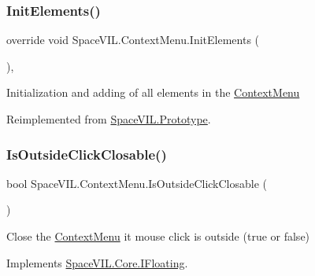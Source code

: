 \subsubsection{\texorpdfstring{Init\+Elements()}{InitElements()}}
{\footnotesize\ttfamily override void Space\+V\+I\+L.\+Context\+Menu.\+Init\+Elements (\begin{DoxyParamCaption}{ }\end{DoxyParamCaption})\hspace{0.3cm}{\ttfamily [inline]}, {\ttfamily [virtual]}}



Initialization and adding of all elements in the \mbox{\hyperlink{class_space_v_i_l_1_1_context_menu}{Context\+Menu}} 



Reimplemented from \mbox{\hyperlink{class_space_v_i_l_1_1_prototype_ac3379fe02923ee155b5b0084abf27420}{Space\+V\+I\+L.\+Prototype}}.

\mbox{\label{class_space_v_i_l_1_1_context_menu_ab679391d913d15a6341e9ccb0f3b4bf9}} 
\subsubsection{\texorpdfstring{Is\+Outside\+Click\+Closable()}{IsOutsideClickClosable()}}
{\footnotesize\ttfamily bool Space\+V\+I\+L.\+Context\+Menu.\+Is\+Outside\+Click\+Closable (\begin{DoxyParamCaption}{ }\end{DoxyParamCaption})\hspace{0.3cm}{\ttfamily [inline]}}



Close the \mbox{\hyperlink{class_space_v_i_l_1_1_context_menu}{Context\+Menu}} it mouse click is outside (true or false) 



Implements \mbox{\hyperlink{interface_space_v_i_l_1_1_core_1_1_i_floating}{Space\+V\+I\+L.\+Core.\+I\+Floating}}.

\mbox{\label{class_space_v_i_l_1_1_context_menu_a35bae3cc791ba6de129af36ddb0fb63b}} 
